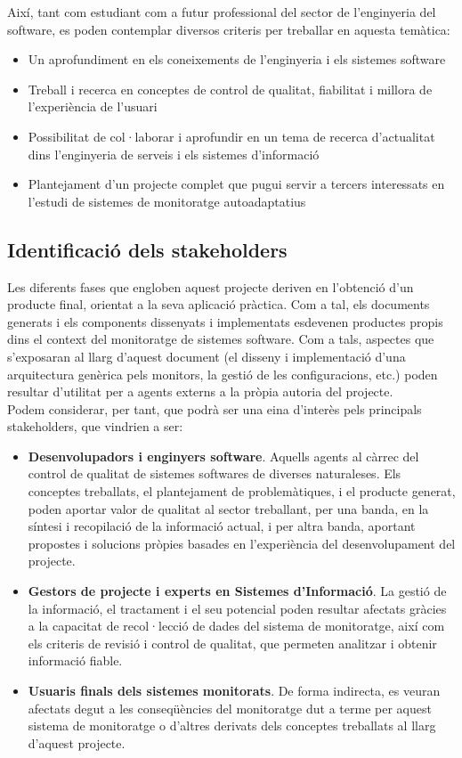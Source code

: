 Així, tant com estudiant com a futur professional del sector de l’enginyeria del software, es poden contemplar diversos criteris per treballar en aquesta temàtica:
\begin{itemize}
\item Un aprofundiment en els coneixements de l’enginyeria i els sistemes software
\item Treball i recerca en conceptes de control de qualitat, fiabilitat i millora de l'experiència de l'usuari
\item Possibilitat de col·laborar i aprofundir en un tema de recerca d’actualitat dins l’enginyeria de serveis i els sistemes d’informació
\item Plantejament d’un projecte complet que pugui servir a tercers interessats en l’estudi de sistemes de monitoratge autoadaptatius
\end{itemize}  

\subsection{Identificació dels stakeholders}

Les diferents fases que engloben aquest projecte deriven en l'obtenció d'un producte final, orientat a la seva aplicació pràctica. Com a tal, els documents generats i els components dissenyats i implementats esdevenen productes propis dins el context del monitoratge de sistemes software. Com a tals, aspectes que s'exposaran al llarg d'aquest document (el disseny i implementació d'una arquitectura genèrica pels monitors, la gestió de les configuracions, etc.) poden resultar d'utilitat per a agents externs a la pròpia autoria del projecte.\\

Podem considerar, per tant, que podrà ser una eina d’interès pels principals stakeholders, que vindrien a ser:
\begin{itemize}
\item \textbf{Desenvolupadors i enginyers software}. Aquells agents al càrrec del control de qualitat de sistemes softwares de diverses naturaleses. Els conceptes treballats, el plantejament de problemàtiques, i el producte generat, poden aportar valor de qualitat al sector treballant, per una banda, en la síntesi i recopilació de la informació actual, i per altra banda, aportant propostes i solucions pròpies basades en l’experiència del desenvolupament del projecte.
\item \textbf{Gestors de projecte i experts en Sistemes d'Informació}. La gestió de la informació, el tractament i el seu potencial poden resultar afectats gràcies a la capacitat de recol·lecció de dades del sistema de monitoratge, així com els criteris de revisió i control de qualitat, que permeten analitzar i obtenir informació fiable.
\item \textbf{Usuaris finals dels sistemes monitorats}. De forma indirecta, es veuran afectats degut a les conseqüències del monitoratge dut a terme per aquest sistema de monitoratge o d’altres derivats dels conceptes treballats al llarg d’aquest projecte.
\end{itemize}

